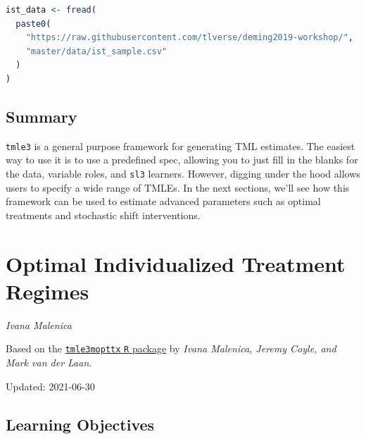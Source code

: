 \documentclass[12pt, krantz2,]{krantz}
\newcommand{\passthrough}[1]{#1}
\theoremstyle{definition}
\theoremstyle{definition}
\theoremstyle{definition}
\newcommand{\1}{\mathbbm{1}}
\begin{document}
\begin{lstlisting}[language=R]
ist_data <- fread(
  paste0(
    "https://raw.githubusercontent.com/tlverse/deming2019-workshop/",
    "master/data/ist_sample.csv"
  )
)
\end{lstlisting}

\hypertarget{summary}{%
\section{Summary}\label{summary}}

\passthrough{\lstinline!tmle3!} is a general purpose framework for generating TML estimates. The easiest
way to use it is to use a predefined spec, allowing you to just fill in the
blanks for the data, variable roles, and \passthrough{\lstinline!sl3!} learners. However, digging under
the hood allows users to specify a wide range of TMLEs. In the next sections,
we'll see how this framework can be used to estimate advanced parameters such as
optimal treatments and stochastic shift interventions.

\hypertarget{optimal-individualized-treatment-regimes}{%
\chapter{Optimal Individualized Treatment Regimes}\label{optimal-individualized-treatment-regimes}}

\emph{Ivana Malenica}

Based on the \href{https://github.com/tlverse/tmle3mopttx}{\passthrough{\lstinline!tmle3mopttx!} \passthrough{\lstinline!R!} package}
by \emph{Ivana Malenica, Jeremy Coyle, and Mark van der Laan}.

Updated: 2021-06-30

\hypertarget{learning-objectives-1}{%
\section{Learning Objectives}\label{learning-objectives-1}}
\end{document}
